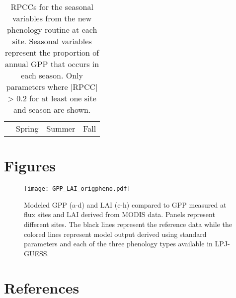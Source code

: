 \documentclass[]{article}
\begin{document}
\begin{table}[ht]
	\begin{threeparttable}
		\caption{RPCCs for the seasonal variables from the new phenology routine at each site. Seasonal variables represent the proportion of annual GPP that occurs in each season. Only parameters where |RPCC| > 0.2 for at least one site and season are shown.} 
		\begin{tabularx}{\textwidth}{lrrrrrrrrrrrr}
			\toprule
			& \multicolumn{4}{c}{Spring} & \multicolumn{4}{c}{Summer} & \multicolumn{4}{c}{Fall} \\
			\cmidrule(lr){2-5} \cmidrule(lr){6-9} \cmidrule(lr){10-13}
			
		\end{tabularx}
	\end{threeparttable}
\end{table}

\section{Figures}
\begin{figure}[!htbp]
\begin{measuredfigure}
	\texttt{[image: GPP\_LAI\_origpheno.pdf]}
	\caption{Modeled GPP (a-d) and LAI (e-h) compared to GPP measured at flux sites and LAI derived from MODIS data. Panels represent different sites. The black lines represent the reference data while the colored lines represent model output derived using standard parameters and each of the three phenology types available in LPJ-GUESS.}
	\label{fig:origpheno}
	\end{measuredfigure}
\end{figure}

\section{References}


\end{document}
